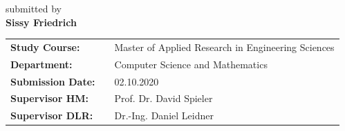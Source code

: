 \begin{center}
\begin{center}
\small{submitted by} \\
\large{\textbf{Sissy Friedrich}}
\end{center}
\vspace{1.5cm}


\begin{center}
	\begin{tabular}{lll}
		\textbf{Study Course:} & &Master of Applied Research in Engineering Sciences\\
		\textbf{Department:} & &Computer Science and Mathematics\\
		\textbf{Submission Date:} & &02.10.2020\\
		\textbf{Supervisor HM:} & &Prof. Dr. David Spieler\\
		\textbf{Supervisor DLR:} & &Dr.-Ing. Daniel Leidner
	\end{tabular}
\end{center}




\end{center}
